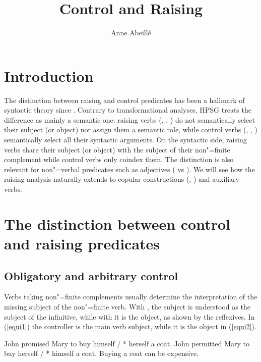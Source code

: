 \documentclass[output=paper
                ,modfonts
                ,nonflat
	        ,collection
	        ,collectionchapter
	        ,collectiontoclongg
 	        ,biblatex
                ,babelshorthands
                ,newtxmath
                ,draftmode
                ,colorlinks, citecolor=brown
]{./langsci/langscibook}
\author{%
	Anne Abeillé\affiliation{Université de Paris}%
}
\title{Control and Raising}
\begin{document}
\maketitle
\label{chap-control-raising}

\section{Introduction}
\label{control-sec-intro}

The distinction between raising and control predicates has been a hallmark of syntactic theory since \citet{Postal1974}. Contrary to transformational analyses, HPSG treats the difference as mainly a semantic one: raising verbs (, , ) do not semantically select their subject (or object) nor assign them a semantic role, while control verbs (, , ) semantically select all their syntactic arguments. On the syntactic side, raising verbs share their subject (or object) with the subject of their non"=finite complement while control verbs only coindex them. The distinction is also relevant for non"=verbal predicates such as adjectives ( vs ). We will see how the raising analysis naturally extends to copular constructions (, ) and auxiliary verbs. 



\section{The distinction between control and raising predicates}

\subsection{Obligatory and arbitrary control}

Verbs taking non"=finite complements usually determine the interpretation of the missing subject of the non"=finite verb. With , the subject is understood as the subject of the infinitive, while with  it is the object, as shown by the reflexives. In (\ref{equi1}) the controller is the main verb subject, while it is the object in (\ref{equi2}).

	\begin{exe}
	\ex \begin{xlist}
	\ex John promised Mary to buy himself / * herself a coat. \label{equi1}
   \ex 	John permitted Mary to buy herself / * himself a coat.\label{equi2}
 \ex Buying a coat can be expensive.\label{arbitrary}
 \end{xlist}
 \end{exe}
\end{document}
